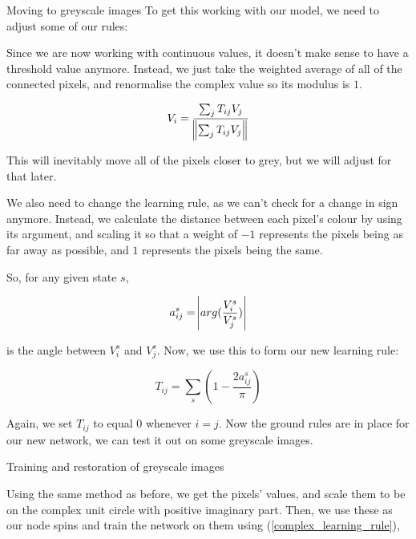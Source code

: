 \documentclass[25pt, a0paper, portrait]{beamer}
\newlength{\colwidth}
\begin{document}
\begin{frame}[t]
\begin{columns}[t]
\begin{column}{\colwidth}
\begin{block}{Moving to greyscale images}
    To get this working with our model, we need to adjust some of our rules:


    Since we are now working with continuous values, it doesn't make sense to have a threshold
    value anymore. Instead, we just take the weighted average of all of the connected pixels,
    and renormalise the complex value so its modulus is $1$.

    \begin{equation} \label{complex_update_rule}
      V_i = \frac{\sum_{j}T_{ij}V_j}{\norm{\sum_{j}T_{ij}V_j}}
    \end{equation}

    This will inevitably move all of the pixels closer to grey, but we will adjust for that later.


    We also need to change the learning rule, as we can't check for a change in sign anymore.
    Instead, we calculate the distance between each pixel's colour by using its argument, and
    scaling it so that a weight of $-1$ represents the pixels being as far away as possible,
    and $1$ represents the pixels being the same.

    So, for any given state $s$,

    \begin{equation*}
      a^s_{ij} = \abs{arg(\frac{V^s_i}{V^s_j})}
    \end{equation*}

    is the angle between $V^s_i$ and $V^s_j$. Now, we use this to form our new learning rule:
    
    \begin{equation} \label{complex_learning_rule}
      T_{ij} = \sum_{s}(1 - \frac{2a^s_{ij}}{\pi})
    \end{equation}

    Again, we set $T_{ij}$ to equal $0$ whenever $i = j$. Now the ground rules are in place
    for our new network, we can test it out on some greyscale images.

  \end{block}

  \begin{block}{Training and restoration of greyscale images} \small

    Using the same method as before, we get the pixels' values, and scale them to be on the
    complex unit circle with positive imaginary part. Then, we use these as our node spins and
    train the network on them using (\ref{complex_learning_rule}), 


\end{block}
\end{column}
\end{columns}
\end{frame}
\end{document}
